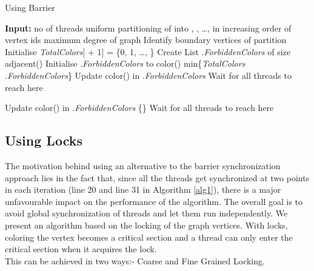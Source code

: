 \documentclass[a4paper,11pt]{article}
\begin{document}
\begin{algorithm}[H]


\caption{Using Barrier}
\label{alg1}
\begin{algorithmic}[1]

\State \textbf{Input:}   no of threads
\State uniform partitioning of  into , , \dots,  in increasing order of vertex ids
\State   maximum degree of graph
\State Identify boundary vertices of partition 
\State Initialise \textit{TotalColors}[ + 1] = \{0, 1, \dots, \}
\For{  }
\State Create List .\textit{ForbiddenColors} of size  adjacent()
\State Initialise .\textit{ForbiddenColors} to  
\EndFor
\State   
\While{  }
 
\State color()  min\{\textit{TotalColors}  .\textit{ForbiddenColors}\}
\State Update color() in .\textit{ForbiddenColors}
\EndFor
\EndFor
\State Wait for all threads to reach here 
\end{algorithmic}
\end{algorithm}

\begin{algorithm}                     
\begin{algorithmic} [1]                   

\State    
{}

\State Update color() in .\textit{ForbiddenColors}
\State     \{\}
\EndIf
\EndFor
\EndFor
\State   
\State Wait for all threads to reach here 
\EndWhile
\EndFor
\EndProcedure
\end{algorithmic}


\end{algorithm}

\subsection{Using Locks}
The motivation behind using an alternative to the barrier synchronization approach lies in the fact that, since all the threads get synchronized at two points in each iteration (line 20 and line 31 in Algorithm \ref{alg1}), there is a major unfavourable impact on the performance of the algorithm. The overall goal is to avoid global synchronization of threads and let them run independently. We present an algorithm based on the locking of the graph vertices. With locks, coloring the vertex becomes a critical section and a thread can only enter the critical section when it acquires the lock.\\
This can be achieved in two ways:- Coarse and Fine Grained Locking. 
\end{document}
